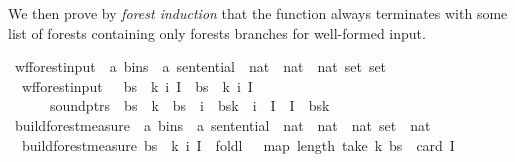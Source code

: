 \begin{isabellebody}
\begin{isamarkuptext}
We then prove by \textit{forest induction} that the function  always terminates
with some list of forests containing only forests branches for well-formed input.%
\end{isamarkuptext}\isamarkuptrue%
\isamarkupfalse%
\ wf{\isacharunderscore}{\kern0pt}forest{\isacharunderscore}{\kern0pt}input\ {\isacharcolon}{\kern0pt}{\isacharcolon}{\kern0pt}\ {\isachardoublequoteopen}{\isacharparenleft}{\kern0pt}{\isacharprime}{\kern0pt}a\ bins\ {\isasymtimes}\ {\isacharprime}{\kern0pt}a\ sentential\ {\isasymtimes}\ nat\ {\isasymtimes}\ nat\ {\isasymtimes}\ nat\ set{\isacharparenright}{\kern0pt}\ set{\isachardoublequoteclose}\ \isanewline
\ \ {\isachardoublequoteopen}wf{\isacharunderscore}{\kern0pt}forest{\isacharunderscore}{\kern0pt}input\ {\isacharequal}{\kern0pt}\ {\isacharbraceleft}{\kern0pt}\ {\isacharparenleft}{\kern0pt}bs{\isacharcomma}{\kern0pt}\ {\isasymomega}{\isacharcomma}{\kern0pt}\ k{\isacharcomma}{\kern0pt}\ i{\isacharcomma}{\kern0pt}\ I{\isacharparenright}{\kern0pt}\ {\isacharbar}{\kern0pt}\ bs\ {\isasymomega}\ k\ i\ I{\isachardot}{\kern0pt}\isanewline
\ \ \ \ \ \ sound{\isacharunderscore}{\kern0pt}ptrs\ {\isasymomega}\ bs\ {\isasymand}\ k\ {\isacharless}{\kern0pt}\ {\isacharbar}{\kern0pt}bs{\isacharbar}{\kern0pt}\ {\isasymand}\ i\ {\isacharless}{\kern0pt}\ {\isacharbar}{\kern0pt}bs{\isacharbang}{\kern0pt}k{\isacharbar}{\kern0pt}\ {\isasymand}\ i\ {\isasymin}\ I\ {\isasymand}\ I\ {\isasymsubseteq}\ {\isacharbraceleft}{\kern0pt}{}{\isachardot}{\kern0pt}{\isachardot}{\kern0pt}{\isacharless}{\kern0pt}{\isacharbar}{\kern0pt}bs{\isacharbang}{\kern0pt}k{\isacharbar}{\kern0pt}{\isacharbraceright}{\kern0pt}\ {\isacharbraceright}{\kern0pt}{\isachardoublequoteclose}\isanewline
\isanewline
{}\isamarkupfalse%
\ build{\isacharunderscore}{\kern0pt}forest{\isacharprime}{\kern0pt}{\isacharunderscore}{\kern0pt}measure\ {\isacharcolon}{\kern0pt}{\isacharcolon}{\kern0pt}\ {\isachardoublequoteopen}{\isacharparenleft}{\kern0pt}{\isacharprime}{\kern0pt}a\ bins\ {\isasymtimes}\ {\isacharprime}{\kern0pt}a\ sentential\ {\isasymtimes}\ nat\ {\isasymtimes}\ nat\ {\isasymtimes}\ nat\ set{\isacharparenright}{\kern0pt}\ {\isasymRightarrow}\ nat{\isachardoublequoteclose}\ \isanewline
\ \ {\isachardoublequoteopen}build{\isacharunderscore}{\kern0pt}forest{\isacharprime}{\kern0pt}{\isacharunderscore}{\kern0pt}measure\ {\isacharparenleft}{\kern0pt}bs{\isacharcomma}{\kern0pt}\ {\isasymomega}{\isacharcomma}{\kern0pt}\ k{\isacharcomma}{\kern0pt}\ i{\isacharcomma}{\kern0pt}\ I{\isacharparenright}{\kern0pt}\ {\isacharequal}{\kern0pt}\ foldl\ {\isacharparenleft}{\kern0pt}{\isacharplus}{\kern0pt}{\isacharparenright}{\kern0pt}\ {}\ {\isacharparenleft}{\kern0pt}map\ length\ {\isacharparenleft}{\kern0pt}take\ {\isacharparenleft}{\kern0pt}k{\isacharplus}{\kern0pt}{}{\isacharparenright}{\kern0pt}\ bs{\isacharparenright}{\kern0pt}{\isacharparenright}{\kern0pt}\ {\isacharminus}{\kern0pt}\ card\ I{\isachardoublequoteclose}\isanewline

\end{isabellebody}
